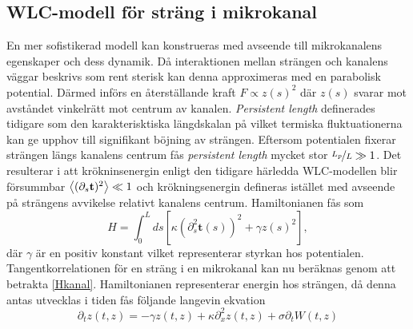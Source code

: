 \subsection{WLC-modell för sträng i mikrokanal}

En mer sofistikerad modell kan konstrueras med avseende till mikrokanalens egenskaper och dess dynamik. Då interaktionen mellan strängen och kanalens väggar beskrivs som rent sterisk \cite{Koster_etal2007} kan denna approximeras med en parabolisk potential. Därmed införs en återställande kraft $F \propto z(s)^2$ där $z(s)$ svarar mot avståndet vinkelrätt mot centrum av kanalen. \emph{Persistent length} definerades tidigare som den karakterisktiska längdskalan på vilket termiska fluktuationerna kan ge upphov till signifikant böjning av strängen. Eftersom potentialen fixerar strängen längs kanalens centrum fås \emph{persistent length} mycket stor $\nicefrac{L_{p}}{L}\gg 1$. Det resulterar i att krökninsenergin enligt den tidigare härledda WLC-modellen blir försummbar \cite{PhysRevE.60.4671} $\ev{(\partial_{s}\mathbf{t})^2}\ll 1$ och  krökningsenergin defineras istället med avseende på strängens avvikelse relativt kanalens centrum. Hamiltonianen fås som
\begin{equation}
\label{Hkanal}
    H=\int_{0}^{L}ds[\kappa(\partial_{s}^2\mathbf{t}(s))^2+ \gamma z(s)^2],
\end{equation}
där $\gamma$ är en positiv konstant vilket representerar styrkan hos potentialen.\\
Tangentkorrelationen för en sträng i en mikrokanal kan nu beräknas genom att betrakta \eqref{Hkanal}. Hamiltonianen representerar energin hos strängen, då denna antas utvecklas i tiden fås följande langevin ekvation
\begin{equation}
\label{mans}
    \partial_{t}z(t,z)=-\gamma z(t,z)+\kappa \partial_{x}^{2}z(t,z)+\sigma \partial_{t}W(t,z)
\end{equation}
